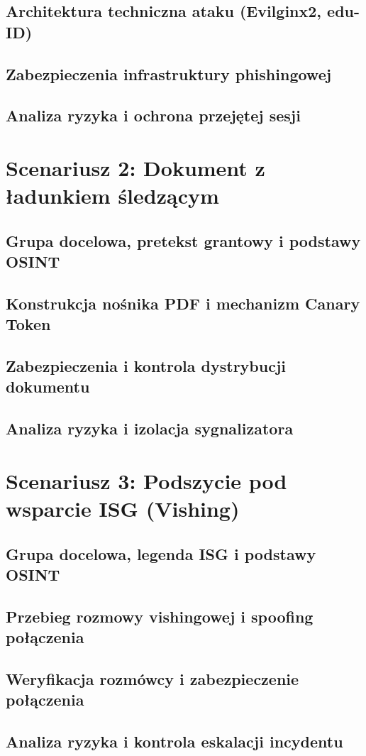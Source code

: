 \subsection{Architektura techniczna ataku (Evilginx2, edu-ID)}\label{subsec:scen1-techniczny}
\subsection{Zabezpieczenia infrastruktury phishingowej}\label{subsec:scen1-zabezpieczenia}
\subsection{Analiza ryzyka i ochrona przejętej sesji}\label{subsec:scen1-ryzyko}

\section{Scenariusz 2: Dokument z ładunkiem śledzącym}\label{sec:scenariusz-2}
\subsection{Grupa docelowa, pretekst grantowy i podstawy OSINT}\label{subsec:scen2-cel}
\subsection{Konstrukcja nośnika PDF i mechanizm Canary Token}\label{subsec:scen2-techniczny}
\subsection{Zabezpieczenia i kontrola dystrybucji dokumentu}\label{subsec:scen2-zabezpieczenia}
\subsection{Analiza ryzyka i izolacja sygnalizatora}\label{subsec:scen2-ryzyko}

\section{Scenariusz 3: Podszycie pod wsparcie ISG (Vishing)}\label{sec:scenariusz-3}
\subsection{Grupa docelowa, legenda ISG i podstawy OSINT}\label{subsec:scen3-cel}
\subsection{Przebieg rozmowy vishingowej i spoofing połączenia}\label{subsec:scen3-techniczny}
\subsection{Weryfikacja rozmówcy i zabezpieczenie połączenia}\label{subsec:scen3-zabezpieczenia}
\subsection{Analiza ryzyka i kontrola eskalacji incydentu}\label{subsec:scen3-ryzyko}
